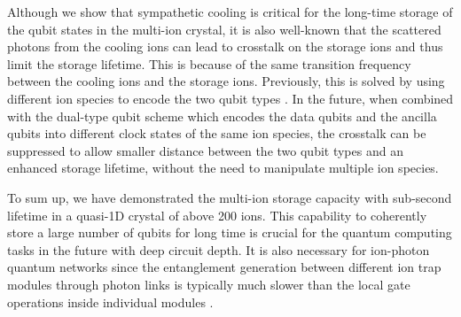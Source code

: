 Although we show that sympathetic cooling is critical for the long-time storage of the qubit states in the multi-ion crystal, it is also well-known that the scattered photons from the cooling ions can lead to crosstalk on the storage ions and thus limit the storage lifetime. This is because of the same transition frequency between the cooling ions and the storage ions. Previously, this is solved by using different ion species to encode the two qubit types \cite{wang2021single,chen2017sympathetic,blinov2002sympathetic,barrett2003sympathetic,home2009memory}. In the future, when combined with the dual-type qubit scheme which encodes the data qubits and the ancilla qubits into different clock states of the same ion species, the crosstalk can be suppressed to allow smaller distance between the two qubit types and an enhanced storage lifetime, without the need to manipulate multiple ion species.

To sum up, we have demonstrated the multi-ion storage capacity with sub-second lifetime in a quasi-1D crystal of above 200 ions. This capability to coherently store a large number of qubits for long time is crucial for the quantum computing tasks in the future with deep circuit depth. It is also necessary for ion-photon quantum networks since the entanglement generation between different ion trap modules through photon links is typically much slower than the local gate operations inside individual modules \cite{hucul2015modular}.
